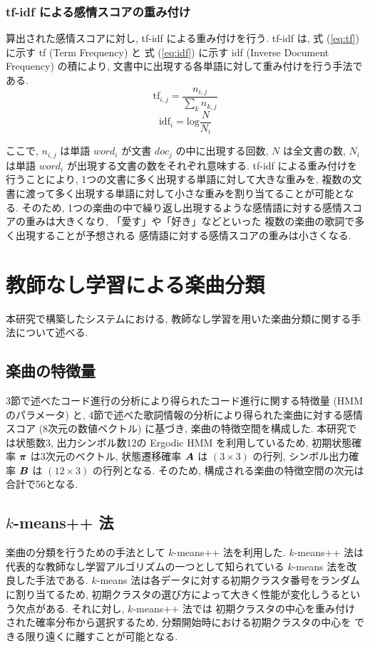 \documentclass{jpreprint}
\def\vector#1{\mbox{\boldmath{$#1$}}}
\begin{document}
\begin{multicols}{2}
\subsubsection{tf-idf による感情スコアの重み付け}
算出された感情スコアに対し,
tf-idf による重み付けを行う.
tf-idf は,
式 (\ref{eq:tf}) に示す tf (Term Frequency) と
式 (\ref{eq:idf}) に示す idf (Inverse Document Frequency) の積により,
文書中に出現する各単語に対して重み付けを行う手法である.
\begin{equation}\label{eq:tf}
\mathrm{tf}_{i, j} = \dfrac{n_{i, j}}{\sum_{k}n_{k, j}}
\end{equation}
\begin{equation}\label{eq:idf}
\mathrm{idf}_{i} = \mathrm{log}\dfrac{N}{N_{i}}
\end{equation}

ここで,
$n_{i, j}$ は単語 $word_{i}$ が文書 $doc_{j}$ の中に出現する回数,
$N$ は全文書の数,
$N_{i}$ は単語 $word_{i}$ が出現する文書の数をそれぞれ意味する.
tf-idf による重み付けを行うことにより,
1つの文書に多く出現する単語に対して大きな重みを,
複数の文書に渡って多く出現する単語に対して小さな重みを割り当てることが可能となる.
そのため,
1つの楽曲の中で繰り返し出現するような感情語に対する感情スコアの重みは大きくなり,
「愛す」や「好き」などといった
複数の楽曲の歌詞で多く出現することが予想される
感情語に対する感情スコアの重みは小さくなる.

\section{教師なし学習による楽曲分類}
本研究で構築したシステムにおける,
教師なし学習を用いた楽曲分類に関する手法について述べる.
\subsection{楽曲の特徴量}
3節で述べたコード進行の分析により得られたコード進行に関する特徴量
(HMM のパラメータ) と,
4節で述べた歌詞情報の分析により得られた楽曲に対する感情スコア
(8次元の数値ベクトル) に基づき,
楽曲の特徴空間を構成した.
本研究では状態数3, 出力シンボル数12の Ergodic HMM を利用しているため,
初期状態確率 $\vector{\pi}$ は3次元のベクトル,
状態遷移確率 $\vector{A}$ は $(3 \times 3)$ の行列,
シンボル出力確率 $\vector{B}$ は $(12 \times 3)$ の行列となる.
そのため,
構成される楽曲の特徴空間の次元は合計で56となる.

\subsection{$k$-means++ 法}
楽曲の分類を行うための手法として $k$-means++ 法\cite{KMPP}を利用した.
$k$-means++ 法は
代表的な教師なし学習アルゴリズムの一つとして知られている
$k$-means 法\cite{KMEANS}を改良した手法である.
$k$-means 法は各データに対する初期クラスタ番号をランダムに割り当てるため,
初期クラスタの選び方によって大きく性能が変化しうるという欠点がある.
それに対し, $k$-means++ 法では
初期クラスタの中心を重み付けされた確率分布から選択するため,
分類開始時における初期クラスタの中心を
できる限り遠くに離すことが可能となる.


\end{multicols}
\end{document}
